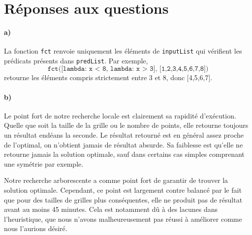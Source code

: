 \documentclass[12pt]{article}
\begin{document}
\section{Réponses aux questions}
\paragraph{a)}
La fonction \texttt{fct} renvoie uniquement les éléments de \texttt{inputList} qui vérifient les prédicats présents dans \texttt{predList}.
Par exemple,
\begin{equation*}
	\texttt{fct([lambda: x < 8, lambda: x > 3], [1,2,3,4,5,6,7,8])}
\end{equation*}
retourne les éléments compris strictement entre 3 et 8, donc [4,5,6,7].


\paragraph{b)}
Le point fort de notre recherche locale est clairement sa rapidité d'exécution. Quelle que soit la taille de la grille ou le nombre de points, elle retourne toujours un résultat endéans la seconde. Le résultat retourné est en général assez proche de l'optimal, on n'obtient jamais de résultat absurde. Sa faiblesse est qu'elle ne retourne jamais la solution optimale, sauf dans certains cas simples comprenant une symétrie par exemple.

Notre recherche arborescente a comme point fort de garantir de trouver la solution optimale. Cependant, ce point est largement contre balancé par le fait que pour des tailles de grilles plus conséquentes, elle ne produit pas de résultat avant au moins 45 minutes. Cela est notamment dû à des lacunes dans l'heuristique, que nous n'avons malheureusement pas réussi à améliorer comme nous l'aurions désiré.
\end{document}
